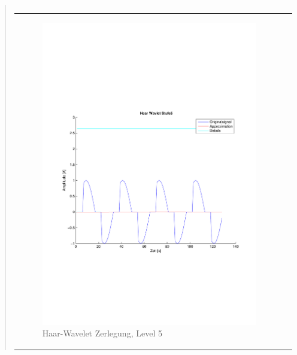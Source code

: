 \begin{quote}
\begin{center}
\begin{tabular}{ll}
                \end{tabular}
                \end{center}
    
                
                
                    \begin{center}
                \begin{tabular}{ll}
    
                \hspace{-8em}
                    \begin{minipage}{0.6\textwidth}
    
                        \begin{figure}[H]
                            \label{fig:}
                            \includegraphics[scale=0.4, trim = 2cm 6cm 1cm
                            7.5cm,
                            clip]{./Bilder/Termin8/Haar_Wavlet_lvl_5}
                            \caption{Haar-Wavelet Zerlegung, Level 5}
                        \end{figure}
    

\end{minipage}
\end{tabular}
\end{center}
\end{quote}
